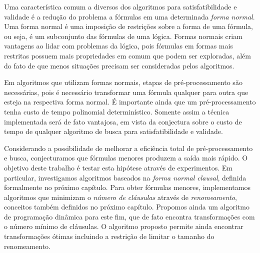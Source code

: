 Uma característica comum a diversos dos algoritmos para satisfatibilidade e validade é a redução do problema a fórmulas em uma determinada \emph{forma normal}. Uma forma normal é uma imposição de restrições sobre a forma de uma fórmula, ou seja, é um subconjunto das fórmulas de uma lógica. Formas normais criam vantagens ao lidar com problemas da lógica, pois fórmulas em formas mais restritas possuem mais propriedades em comum que podem ser exploradas, além do fato de que menos situações precisam ser consideradas pelos algoritmos.

Em algoritmos que utilizam formas normais, etapas de pré-processamento são necessárias, pois é necessário transformar uma fórmula qualquer para outra que esteja na respectiva forma normal. É importante ainda que um pré-processamento tenha custo de tempo polinomial determinístico. Somente assim a técnica implementada será de fato vantajosa, em vista da conjectura sobre o custo de tempo de qualquer algoritmo de busca para satisfatibilidade e validade.

Considerando a possibilidade de melhorar a eficiência total de pré-processamento e busca, conjecturamos que fórmulas menores produzem a saída mais rápido. O objetivo deste trabalho é testar esta hipótese através de experimentos. Em particular, investigamos algoritmos baseados na \emph{forma normal clausal}, definida formalmente no próximo capítulo. Para obter fórmulas menores, implementamos algoritmos que minimizam o \emph{número de cláusulas} através de \emph{renomeamento}, conceitos também definidos no próximo capítulo. Propomos ainda um algoritmo de programação dinâmica para este fim, que de fato encontra transformações com o número mínimo de cláusulas. O algoritmo proposto permite ainda encontrar transformações ótimas incluindo a restrição de limitar o tamanho do renomeamento.
